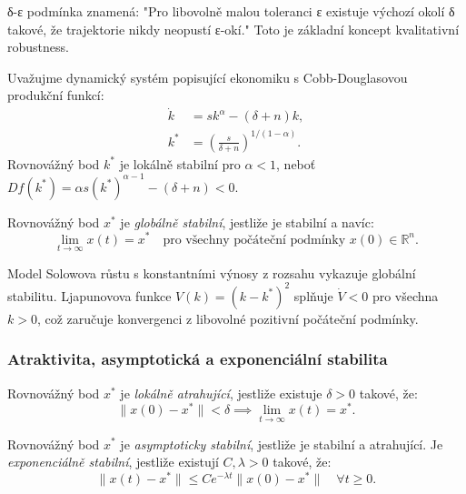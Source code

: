 \begin{intuition}
δ-ε podmínka znamená: "Pro libovolně malou toleranci ε existuje výchozí okolí δ takové, že trajektorie nikdy neopustí ε-okí." Toto je základní koncept kvalitativní robustness.
\end{intuition}

\begin{example}
Uvažujme dynamický systém popisující ekonomiku s Cobb-Douglasovou produkční funkcí:
\begin{align*}
\dot{k} &= s k^\alpha - (\delta + n)k, \\
k^* &= \left(\frac{s}{\delta + n}\right)^{1/(1-\alpha)}.
\end{align*}
Rovnovážný bod $k^*$ je lokálně stabilní pro $\alpha < 1$, neboť $Df(k^*) = \alpha s (k^*)^{\alpha-1} - (\delta + n) < 0$.
\end{example}

\begin{definition}
Rovnovážný bod $x^*$ je \emph{globálně stabilní}, jestliže je stabilní a navíc:
\[
\lim_{t \to \infty} x(t) = x^* \quad \text{pro všechny počáteční podmínky } x(0) \in \mathbb{R}^n.
\]
\end{definition}

\begin{example}
Model Solowova růstu s konstantními výnosy z rozsahu vykazuje globální stabilitu. Ljapunovova funkce $V(k) = (k - k^*)^2$ splňuje $\dot{V} < 0$ pro všechna $k > 0$, což zaručuje konvergenci z libovolné pozitivní počáteční podmínky.
\end{example}

\subsubsection{Atraktivita, asymptotická a exponenciální stabilita}

\begin{definition}[Atraktivita]
Rovnovážný bod $x^*$ je \emph{lokálně atrahující}, jestliže existuje $\delta > 0$ takové, že:
\[
\|x(0) - x^*\| < \delta \implies \lim_{t \to \infty} x(t) = x^*.
\]
\end{definition}

\begin{definition}
Rovnovážný bod $x^*$ je \emph{asymptoticky stabilní}, jestliže je stabilní a atrahující. Je \emph{exponenciálně stabilní}, jestliže existují $C, \lambda > 0$ takové, že:
\[
\|x(t) - x^*\| \leq C e^{-\lambda t} \|x(0) - x^*\| \quad \forall t \geq 0.
\]
\end{definition}

